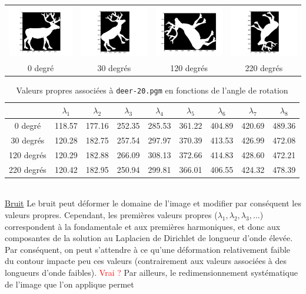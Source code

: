 \documentclass[a4paper,10pt]{article} %
\theoremstyle{definition} %
\begin{document}
\begin{center}
  \begin{tabular}{c c c c}
    \includegraphics[scale=0.15]{rotate/0.png} & \includegraphics[scale=0.15]{rotate/30.png} & \includegraphics[scale=0.15]{rotate/120.png} & \includegraphics[scale=0.15]{rotate/220.png} \\
    0 degré & 30 degrés & 120 degrés & 220 degrés
  \end{tabular}
\end{center}

\begin{table}[H]
  \begin{center}
    \begin{tabular}{c | c c c c c c c c}
                & $\lambda_1$ & $\lambda_2$ & $\lambda_3$ & $\lambda_4$ & $\lambda_5$ & $\lambda_6$ & $\lambda_7$ & $\lambda_8$ \\ \hline
      0 degré    & 118.57 & 177.16 & 252.35 & 285.53 & 361.22 & 404.89 & 420.69 & 489.36 \\
      30 degrés  & 120.28 & 182.75 & 257.54 & 297.97 & 370.39 & 413.53 & 426.99 & 472.08 \\
      120 degrés & 120.29 & 182.88 & 266.09 & 308.13 & 372.66 & 414.83 & 428.60 & 472.21 \\
      220 degrés & 120.42 & 182.95 & 250.94 & 299.81 & 366.01 & 406.55 & 424.32 & 478.39 
    \end{tabular}
  \end{center}
  \caption{Valeurs propres associées à \texttt{deer-20.pgm} en fonctions de l'angle de rotation}
  \label{rot}
\end{table}

~\\
\underline{Bruit} Le bruit peut déformer le domaine de l'image et modifier par conséquent les valeurs propres. Cependant, les premières valeurs propres ($\lambda_1, \lambda_2, \lambda_3, \dots$) correspondent à la fondamentale et aux premières harmoniques, et donc aux composantes de la solution au Laplacien de Dirichlet de longueur d'onde élevée. Par conséquent, on peut s'attendre à ce qu'une déformation relativement faible du contour impacte peu ces valeurs (contrairement aux valeurs associées à des longueurs d'onde faibles). {\huge \textcolor{red}{Vrai ?}} Par ailleurs, le redimensionnement systématique de l'image que l'on applique permet
\end{document}
